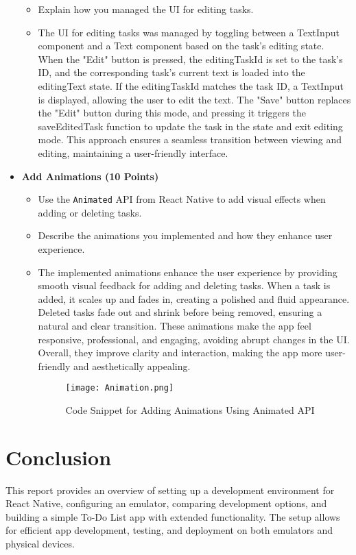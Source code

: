\documentclass{article}
\begin{document}
\begin{itemize}
\begin{itemize}
        \item Explain how you managed the UI for editing tasks.
        \item The UI for editing tasks was managed by toggling between a TextInput component and a Text component based on the task's editing state. When the "Edit" button is pressed, the editingTaskId is set to the task's ID, and the corresponding task's current text is loaded into the editingText state. If the editingTaskId matches the task ID, a TextInput is displayed, allowing the user to edit the text. The "Save" button replaces the "Edit" button during this mode, and pressing it triggers the saveEditedTask function to update the task in the state and exit editing mode. This approach ensures a seamless transition between viewing and editing, maintaining a user-friendly interface.
    \end{itemize}
    
    \item \textbf{Add Animations (10 Points)}
    \begin{itemize}
        \item Use the \texttt{Animated} API from React Native to add visual effects when adding or deleting tasks.
        \item Describe the animations you implemented and how they enhance user experience.
             \item The implemented animations enhance the user experience by providing smooth visual feedback for adding and deleting tasks. When a task is added, it scales up and fades in, creating a polished and fluid appearance. Deleted tasks fade out and shrink before being removed, ensuring a natural and clear transition. These animations make the app feel responsive, professional, and engaging, avoiding abrupt changes in the UI. Overall, they improve clarity and interaction, making the app more user-friendly and aesthetically appealing.
        \begin{figure}[H]
            \centering
            \texttt{[image: Animation.png]}
            \caption{Code Snippet for Adding Animations Using Animated API}
        \end{figure}
    \end{itemize}
\end{itemize}

\section{Conclusion}
This report provides an overview of setting up a development environment for React Native, configuring an emulator, comparing development options, and building a simple To-Do List app with extended functionality. The setup allows for efficient app development, testing, and deployment on both emulators and physical devices.
\end{document}
